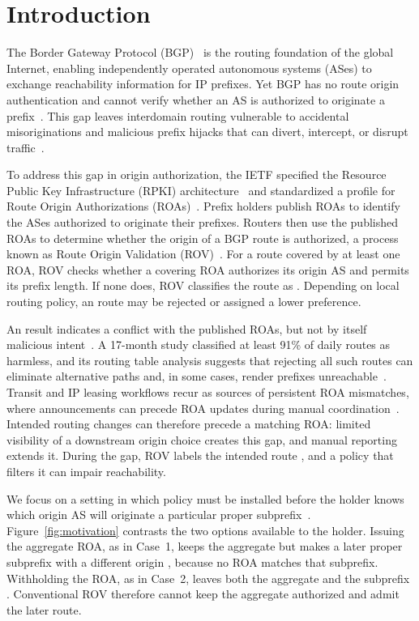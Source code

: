 \section{Introduction}
\label{sec:introduction}

The Border Gateway Protocol (BGP)~\cite{rfc4271} is the routing foundation of the global Internet, enabling independently operated autonomous systems (ASes) to exchange reachability information for IP prefixes. Yet BGP has no route origin authentication and cannot verify whether an AS is authorized to originate a prefix~\cite{rfc4272,kent2000sbgp}. This gap leaves interdomain routing vulnerable to accidental misoriginations and malicious prefix hijacks that can divert, intercept, or disrupt traffic~\cite{ballani2007hijacking,butler2010bgp}.

To address this gap in origin authorization, the IETF specified the Resource Public Key Infrastructure (RPKI) architecture~\cite{rfc6480} and standardized a profile for Route Origin Authorizations (ROAs)~\cite{rfc9582}. Prefix holders publish ROAs to identify the ASes authorized to originate their prefixes. Routers then use the published ROAs to determine whether the origin of a BGP route is authorized, a process known as Route Origin Validation (ROV)~\cite{rfc6811,rfc8481}. For a route covered by at least one ROA, ROV checks whether a covering ROA authorizes its origin AS and permits its prefix length. If none does, ROV classifies the route as \invalid{}. Depending on local routing policy, an \invalid{} route may be rejected or assigned a lower preference.

An \invalid{} result indicates a conflict with the published ROAs, but not by itself malicious intent~\cite{chung2019,xu2019falsealarm,schulmann2025learning}. A 17-month study classified at least 91\% of daily \invalid{} routes as harmless, and its routing table analysis suggests that rejecting all such routes can eliminate alternative paths and, in some cases, render prefixes unreachable~\cite{righttheship2025}. Transit and IP leasing workflows recur as sources of persistent ROA mismatches, where announcements can precede ROA updates during manual coordination~\cite{demystifying2026}. Intended routing changes can therefore precede a matching ROA: limited visibility of a downstream origin choice creates this gap, and manual reporting extends it. During the gap, ROV labels the intended route \invalid{}, and a policy that filters it can impair reachability.

We focus on a setting in which policy must be installed before the holder knows which origin AS will originate a particular proper subprefix~\cite{demystifying2026,leasing2026}. Figure~\ref{fig:motivation} contrasts the two options available to the holder. Issuing the aggregate ROA, as in Case~1, keeps the aggregate \valid{} but makes a later proper subprefix with a different origin \invalid{}, because no ROA matches that subprefix. Withholding the ROA, as in Case~2, leaves both the aggregate and the subprefix \notfound{}. Conventional ROV therefore cannot keep the aggregate authorized and admit the later route.

